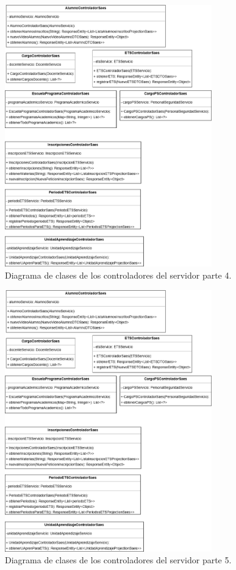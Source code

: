 \begin{figure}[htbp!]
	\begin{center}
		\includegraphics[width=0.8\textwidth]{Clases/Controlador1.png}
		\caption{Diagrama de clases de los controladores del servidor parte 4.}
		\label{fig:DC4}
	\end{center}
\end{figure}

\begin{figure}[htbp!]
	\begin{center}
		\includegraphics[width=0.8\textwidth]{Clases/Controlador1.png}
		\caption{Diagrama de clases de los controladores del servidor parte 5.}
		\label{fig:DC5}
	\end{center}
\end{figure}